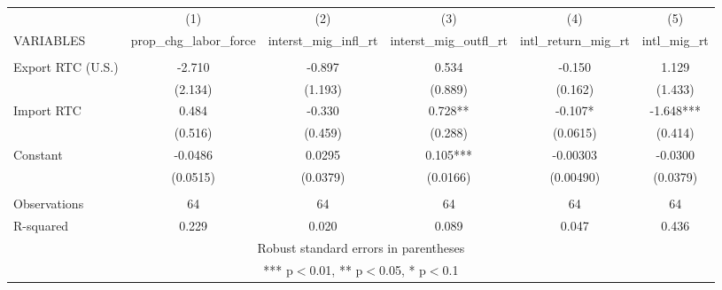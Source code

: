 \begin{tabular}{lccccc} \hline
 & (1) & (2) & (3) & (4) & (5) \\
VARIABLES & prop\_chg\_labor\_force & interst\_mig\_infl\_rt & interst\_mig\_outfl\_rt & intl\_return\_mig\_rt & intl\_mig\_rt \\ \hline
 &  &  &  &  &  \\
Export RTC (U.S.) & -2.710 & -0.897 & 0.534 & -0.150 & 1.129 \\
 & (2.134) & (1.193) & (0.889) & (0.162) & (1.433) \\
Import RTC & 0.484 & -0.330 & 0.728** & -0.107* & -1.648*** \\
 & (0.516) & (0.459) & (0.288) & (0.0615) & (0.414) \\
Constant & -0.0486 & 0.0295 & 0.105*** & -0.00303 & -0.0300 \\
 & (0.0515) & (0.0379) & (0.0166) & (0.00490) & (0.0379) \\
 &  &  &  &  &  \\
Observations & 64 & 64 & 64 & 64 & 64 \\
 R-squared & 0.229 & 0.020 & 0.089 & 0.047 & 0.436 \\ \hline
\multicolumn{6}{c}{ Robust standard errors in parentheses} \\
\multicolumn{6}{c}{ *** p$<$0.01, ** p$<$0.05, * p$<$0.1} \\
\end{tabular}
